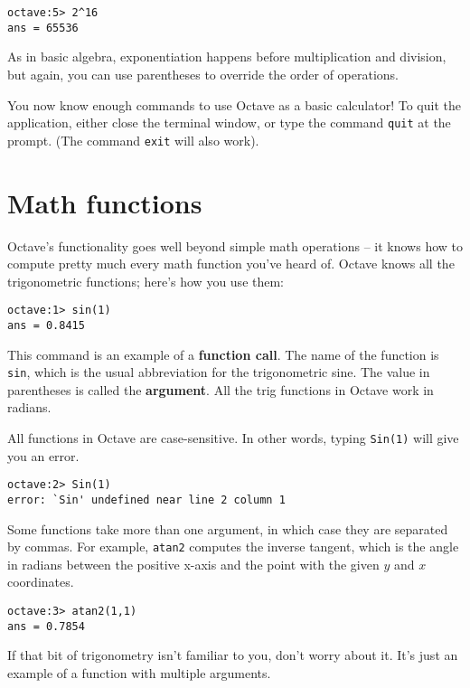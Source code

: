 \begin{verbatim}
octave:5> 2^16
ans = 65536
\end{verbatim}

As in basic algebra, exponentiation happens before multiplication
and division, but again, you can use parentheses to override the order
of operations.

You now know enough commands to use Octave as a basic calculator! To quit the
application, either close the terminal window, or type the command {\tt quit}
at the prompt. (The command {\tt exit} will also work).


\section{Math functions}

Octave's functionality goes well beyond simple math operations -- it knows how
to compute pretty much every math function you've
heard of. Octave knows all the trigonometric functions; here's how you
use them:

\begin{verbatim}
octave:1> sin(1)
ans = 0.8415
\end{verbatim}

This command is an example of a {\bf function call}. The name of the
function is {\tt sin}, which is the usual abbreviation for the
trigonometric sine. The value in parentheses is called the {\bf argument}.
All the trig functions in Octave work in radians.

All functions in Octave are case-sensitive. In other words, typing {\tt Sin(1)}
will give you an error.

\begin{verbatim}
octave:2> Sin(1)
error: `Sin' undefined near line 2 column 1
\end{verbatim}

Some functions take more than one argument, in which case they are
separated by commas. For example, {\tt atan2} computes the inverse
tangent, which is the angle in radians between the positive x-axis and
the point with the given $y$ and $x$ coordinates.

\begin{verbatim}
octave:3> atan2(1,1)
ans = 0.7854
\end{verbatim}

If that bit of trigonometry isn't familiar to you, don't worry about
it. It's just an example of a function with multiple arguments.

